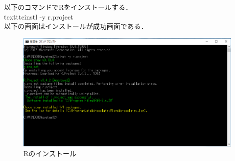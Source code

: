 以下のコマンドでRをインストールする．\\

texttt{cinstl -y r.project}\\

以下の画面はインストールが成功画面である．
\begin{figure}[h]
\centering
\includegraphics[width=13cm,clip]{Rinst.PNG}
\caption{Rのインストール}
\end{figure}
\newpage
